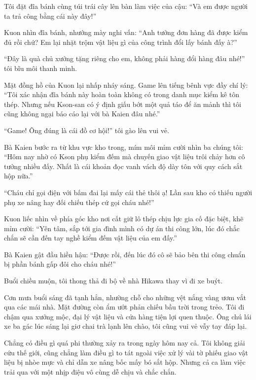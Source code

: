 ﻿\documentclass[../main.tex]{subfiles}
\begin{document}
Tôi đặt đĩa bánh cùng túi trái cây lên bàn làm việc của cậu: ``Và em được người ta trả công bằng cái này đây!''

Kuon nhìn đĩa bánh, nhướng mày nghi vấn: ``Anh tưởng đơn hàng đã được kiểm đủ rồi chứ? Em lại nhặt trộm vật liệu gì của công trình đổi lấy bánh đấy à?''

``Đây là quà chủ xưởng tặng riêng cho em, không phải hàng đổi hàng đâu nhé!'' tôi bĩu môi thanh minh.

Mặt đồng hồ của Kuon lại nhấp nháy sáng. Game lên tiếng bênh vực đầy chí lý: ``Tôi xác nhận đĩa bánh này hoàn toàn không có trong danh mục kiểm kê tôn thép. Nhưng nếu Kson-san có ý định giấu bớt một quả táo để ăn mảnh thì tôi cũng không ngại báo cáo lại với bà Kaien đâu nhé.''

``Game! Ông đúng là cái đồ cơ hội!'' tôi gào lên vui vẻ.

Bà Kaien bước ra từ khu vực kho trong, mím môi mỉm cười nhìn ba chúng tôi: ``Hôm nay nhờ có Kson phụ kiểm đếm mà chuyến giao vật liệu trôi chảy hơn cô tưởng nhiều đấy. Nhất là cái khoản đọc vanh vách độ dày tôn với quy cách sắt hộp nữa.''

``Cháu chỉ gọi điện với bấm đai lại mấy cái thẻ thôi ạ! Lần sau kho có thiếu người phụ xe nâng hay đối chiếu thép cứ gọi cháu nhé!''

Kuon liếc nhìn về phía góc kho nơi cất giữ lô thép chịu lực gia cố đặc biệt, khẽ mỉm cười: ``Yên tâm, sắp tới gia đình mình có dự án thi công lớn, lúc đó chắc chắn sẽ cần đến tay nghề kiểm đếm vật liệu của em đấy.''

Bà Kaien gật đầu hiền hậu: ``Được rồi, đến lúc đó cô sẽ bảo bên thi công chuẩn bị phần bánh gấp đôi cho cháu nhé!''


\omk

Buổi chiều muộn, tôi thong thả đi bộ về nhà Hikawa thay vì đi xe buýt.

Cơn mưa buổi sáng đã tạnh hẳn, nhường chỗ cho những vệt nắng vàng ươm vắt qua các mái nhà. Mặt đường còn ẩm ướt phản chiếu bầu trời trong trẻo. Tôi đi chậm qua xưởng mộc, đại lý vật liệu và cửa hàng tiện lợi quen thuộc. Ông chú lái xe ba gác lúc sáng lại giơ chai trà lạnh lên chào, tôi cũng vui vẻ vẫy tay đáp lại.

Chẳng có điều gì quá phi thường xảy ra trong ngày hôm nay cả. Tôi không giải cứu thế giới, cũng chẳng làm điều gì to tát ngoài việc xử lý vài tờ phiếu giao vật liệu bị nhòe mực và chỉ dẫn xe nâng bốc mấy bó sắt hộp. Nhưng cả ca làm việc trải qua với một nhịp điệu vô cùng dễ chịu và chắc chắn.
\end{document}

